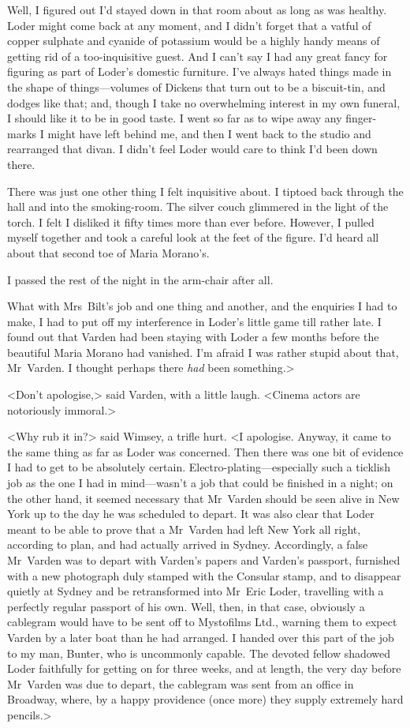 Well, I figured out I'd stayed down in that room about as long as was healthy. Loder might come back at any moment, and I didn't forget that a vatful of copper sulphate and cyanide of potassium would be a highly handy means of getting rid of a too-inquisitive guest. And I can't say I had any great fancy for figuring as part of Loder's domestic furniture. I've always hated things made in the shape of things—volumes of Dickens that turn out to be a biscuit-tin, and dodges like that; and, though I take no overwhelming interest in my own funeral, I should like it to be in good taste. I went so far as to wipe away any finger-marks I might have left behind me, and then I went back to the studio and rearranged that divan. I didn't feel Loder would care to think I'd been down there.

There was just one other thing I felt inquisitive about. I tiptoed back through the hall and into the smoking-room. The silver couch glimmered in the light of the torch. I felt I disliked it fifty times more than ever before. However, I pulled myself together and took a careful look at the feet of the figure. I'd heard all about that second toe of Maria Morano's.

I passed the rest of the night in the arm-chair after all.

What with Mrs~Bilt's job and one thing and another, and the enquiries I had to make, I had to put off my interference in Loder's little game till rather late. I found out that Varden had been staying with Loder a few months before the beautiful Maria Morano had vanished. I'm afraid I was rather stupid about that, Mr~Varden. I thought perhaps there \emph{had} been something.>

<Don't apologise,> said Varden, with a little laugh. <Cinema actors are notoriously immoral.>

<Why rub it in?> said Wimsey, a trifle hurt. <I apologise. Anyway, it came to the same thing as far as Loder was concerned. Then there was one bit of evidence I had to get to be absolutely certain. Electro-plating—especially such a ticklish job as the one I had in mind—wasn't a job that could be finished in a night; on the other hand, it seemed necessary that Mr~Varden should be seen alive in New York up to the day he was scheduled to depart. It was also clear that Loder meant to be able to prove that a Mr~Varden had left New York all right, according to plan, and had actually arrived in Sydney. Accordingly, a false Mr~Varden was to depart with Varden's papers and Varden's passport, furnished with a new photograph duly stamped with the Consular stamp, and to disappear quietly at Sydney and be retransformed into Mr~Eric Loder, travelling with a perfectly regular passport of his own. Well, then, in that case, obviously a cablegram would have to be sent off to Mystofilms Ltd., warning them to expect Varden by a later boat than he had arranged. I handed over this part of the job to my man, Bunter, who is uncommonly capable. The devoted fellow shadowed Loder faithfully for getting on for three weeks, and at length, the very day before Mr~Varden was due to depart, the cablegram was sent from an office in Broadway, where, by a happy providence (once more) they supply extremely hard pencils.>


